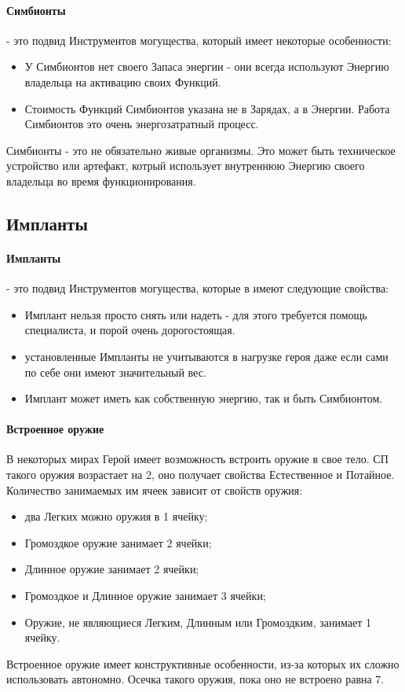 \paragraph{Симбионты} - это подвид Инструментов могущества, который имеет некоторые особенности:
\begin{itemize}
  \item У Симбионтов нет своего Запаса энергии - они всегда используют Энергию владельца на активацию своих Функций.
  \item Стоимость Функций Симбионтов указана не в Зарядах, а в Энергии. Работа Симбионтов это очень энергозатратный процесс.
\end{itemize}
\begin{tcolorbox}
Симбионты - это не обязательно живые организмы. Это может быть техническое устройство или артефакт, котрый использует внутреннюю Энергию своего владельца во время функционирования.
\end{tcolorbox}


\subsection{Импланты}
\paragraph{Импланты} - это подвид Инструментов могущества, которые в имеют следующие свойства:
\begin{itemize}
  \item Имплант нельзя просто снять или надеть - для этого требуется помощь специалиста, и порой очень дорогостоящая.
  \item установленные Импланты не учитываются в нагрузке героя даже если сами по себе они имеют значительный вес.
  \item Имплант может иметь как собственную энергию, так и быть Симбионтом.
\end{itemize}

\paragraph{Встроенное оружие} В некоторых мирах Герой имеет возможность встроить оружие в свое тело. СП такого оружия возрастает на 2, оно получает свойства Естественное и Потайное. Количество занимаемых им ячеек зависит от свойств оружия:
\begin{itemize}
  \item два Легких можно оружия в 1 ячейку;
  \item Громоздкое оружие занимает 2 ячейки;
  \item Длинное оружие занимает 2 ячейки;
  \item Громоздкое и Длинное оружие занимает 3 ячейки;
  \item Оружие, не являющиеся Легким, Длинным или Громоздким, занимает 1 ячейку.
\end{itemize}
Встроенное оружие имеет конструктивные особенности, из-за которых их сложно использовать автономно. Осечка такого оружия, пока оно не встроено равна 7.

